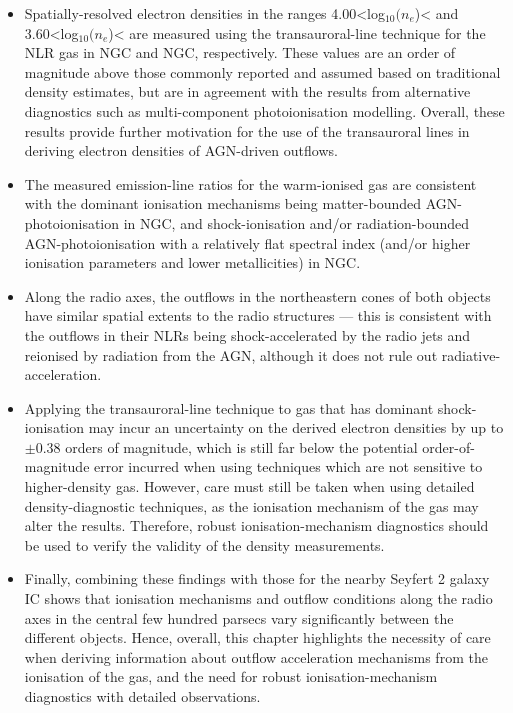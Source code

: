 \begin{itemize}
    \item Spatially-resolved electron densities in the ranges 4.00\;\textless\;log$_{10}(n_e$\;[cm$^{-3}$])\;\textless{} and 3.60\;\textless\;log$_{10}(n_e$\;[cm$^{-3}$])\;\textless{}  are measured using the transauroral-line technique for the NLR gas in NGC and NGC, respectively. These values are an order of magnitude above those commonly reported and assumed based on traditional density estimates, but are in agreement with the results from alternative diagnostics such as multi-component photoionisation modelling. Overall, these results provide further motivation for the use of the transauroral lines in deriving electron densities of AGN-driven outflows.
    \item The measured emission-line ratios for the warm-ionised gas are consistent with the dominant ionisation mechanisms being matter-bounded AGN-photoionisation in NGC, and shock-ionisation and/or radiation-bounded AGN-photoionisation with a relatively flat spectral index (and/or higher ionisation parameters and lower metallicities) in NGC.
    \item Along the radio axes, the outflows in the northeastern cones of both objects have similar spatial extents to the radio structures --- this is consistent with the outflows in their NLRs being shock-accelerated by the radio jets and reionised by radiation from the AGN, although it does not rule out radiative-acceleration.
    \item Applying the transauroral-line technique to gas that has dominant shock-ionisation may incur an uncertainty on the derived electron densities by up to $\pm0.38$ orders of magnitude, which is still far below the potential order-of-magnitude error incurred when using techniques which are not sensitive to higher-density gas. However, care must still be taken when using detailed density-diagnostic techniques, as the ionisation mechanism of the gas may alter the results. Therefore, robust ionisation-mechanism diagnostics should be used to verify the validity of the density measurements.
    \item Finally, combining these findings with those for the nearby Seyfert 2 galaxy IC shows that ionisation mechanisms and outflow conditions along the radio axes in the central few hundred parsecs vary significantly between the different objects. Hence, overall, this chapter highlights the necessity of care when deriving information about outflow acceleration mechanisms from the ionisation of the gas, and the need for robust ionisation-mechanism diagnostics with detailed observations.
\end{itemize}

